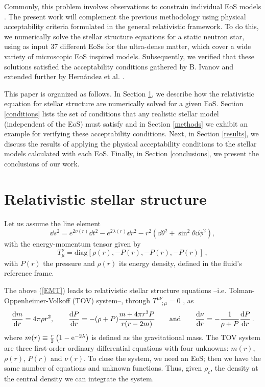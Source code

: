 \documentclass[a4paper]{jpconf} %
\begin{document}
Commonly, this problem involves observations to constrain individual EoS models \cite{OzelFreire2016, HernandezVivancoEtal2019}.  The present work will complement the previous methodology using physical acceptability criteria formulated in the general relativistic framework. To do this, we numerically solve the stellar structure equations for a static neutron star, using as input 37 different EoSs for the ultra-dense matter, which cover a wide variety of microscopic EoS inspired models. Subsequently, we verified that these solutions satisfied the acceptability conditions gathered by B. Ivanov \cite{Ivanov2017} and extended further by Hernández et al. \cite{HernandezNunezVasquez2018, HernandezNunezSuarez2020}. 

This paper is organized as follows. In Section \ref{stellstruct}, we describe how the relativistic equation for stellar structure are numerically solved for a given EoS. Section \ref{conditions} lists the set of conditions that any realistic stellar model (independent of the EoS) must satisfy and in Section \ref{methods} we exhibit an example for verifying these acceptability conditions. Next, in Section \ref{results}, we discuss the results of applying the physical acceptability conditions to the stellar models calculated with each EoS. Finally, in Section \ref{conclusions}, we present the conclusions of our work.


\section{Relativistic stellar structure}\label{stellstruct}
Let us assume the line element 
\begin{equation}
\dd{s}^{ 2 } = e^{ 2 \nu ( r ) } \dd{ t} ^ { 2 } - e ^ { 2 \lambda ( r ) } \dd{ r} ^ { 2 } - r ^ { 2 } \left( \dd{ \theta} ^ { 2 } + \sin ^ { 2 }  \theta  \dd{ \phi} ^ { 2 } \right),
\end{equation}
with the energy-momentum tensor given by
\begin{equation}\label{EMT}
T_\mu^\nu = \mbox{diag}\left[\rho(r),-P(r),-P(r),-P(r)  \right] \,,
\end{equation}
with $P(r)$ the pressure and $\rho(r)$ its energy density, defined in the fluid's reference frame.

The above (\ref{EMT}) leads to relativistic stellar structure equations --i.e. Tolman-Oppenheimer-Volkoff (TOV) system--, through $T^{\mu\nu}_{\quad ; \mu} =0$ , as
\begin{equation}
    \dv{m}{r} = 4\pi \rho r^2, \qquad
\frac{\mathrm{d} P}{\mathrm{d} r} = -(\rho +P)\frac{m + 4 \pi r^{3}P}{r(r-2m)} \qquad \textrm{and} \qquad \dv{\nu}{r} = - \frac{1}{\rho + P} \dv{P}{r} \,.
\label{dnutov}
\end{equation}
where $m(r)\equiv\frac{r}{2} \left(1- {\rm e}^{-2\lambda} \right)$ is defined as the gravitational mass. 
The TOV system are three first-order ordinary differential equations with four unknowns: $m(r)$, $\rho(r)$, $P(r)$ and $\nu(r)$. To close the system, we need an EoS; then we have the same number of equations and unknown functions. Thus, given $\rho_c$, the density at the central density we can integrate the system. 
\end{document}
